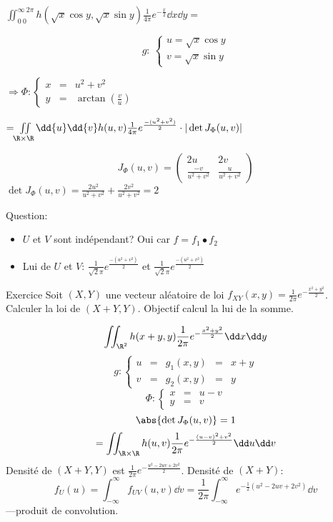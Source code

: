 {\small

$\iint_{0\ 0}^{\infty\ 2\pi} h(\sqrt x \cos y,\sqrt x \sin y)\frac 1{4\pi}e^{-\frac x2}\dd{x}\dd{y}=$

$$g:\ \left\{\begin{array}{ccc}u=\sqrt x \cos y\\ v=\sqrt x \sin y\end{array}\right.$$

$\Rightarrow \Phi: \left\{\begin{array}{rcl}x&=&u^2+v^2 \\ y&=&\arctan(\frac vu) \end{array}\right.$


$=\iint\limits_{\R\times\R}\dd{u}\dd{v} h(u,v) \frac 1{4\pi}e^{\frac{-(u^2+v^2)}2}\cdot |\det J_\Phi (u,v)|$

$$J_\Phi(u,v)=\left(\begin{array}{cc}2u&2v\\ \frac{-v}{u^2+v^2}&\frac u{u^2+v^2}\end{array}\right)$$
$\det J_\Phi (u,v)=\frac{2u^2}{u^2+v^2}+\frac{2v^2}{u^2+v^2}=2$

Question:
\begin{itemize}
	\item $U$ et $V$ sont indépendant? Oui car $f=f_1•f_2$
	\item Lui de $U$ et $V$:
	$\frac 1{\sqrt 2\pi}e^{\frac{-(u^2+v^2)}2}$ et $\frac 1{\sqrt 2\pi}e^{\frac{-(u^2+v^2)}2}$
\end{itemize}

Exercice
Soit $(X,Y)$ une vecteur aléatoire de loi $f_{XY}(x,y)=\frac 1{2\pi}e^{-\frac{x^2+y^2}2}$. Calculer la loi de $(X+Y,Y)$.
Objectif calcul la lui de la somme.

$$\iint_{\R^2}h(x+y, y)\frac 1{2\pi}e^{-\frac{x^2+y^2}2}\dd x\dd y$$
$$g: \left\{ \begin{array}{ccccc}u&=&g_1(x,y)&=&x+y\\v&=&g_2(x,y)&=&y\end{array} \right.$$
$$\Phi: \left\{ \begin{array}{ccc}x&=&u-v\\y&=&v\end{array} \right.$$
$$\abs{\det J_\Phi (u,v)}=1$$
$$=\iint_{\R\times\R}h(u,v)\frac{1}{2\pi}e^{-\frac{(u-v)^2+v^2}{2}}\dd u\dd v$$
Densité de $(X+Y,Y)$ est $\frac{1}{2\pi}e^{-\frac{u^2-2uv+2v^2}{2}}$.
Densité de $(X+Y)$:
$$f_U(u)=\int_{-\infty}^\infty f_{UV}(u,v)\dd v=\frac 1{2\pi}\int_{-\infty}^\infty e^{-\frac 12(u^2-2uv+2v^2)}\dd v$$
---produit de convolution.
}

